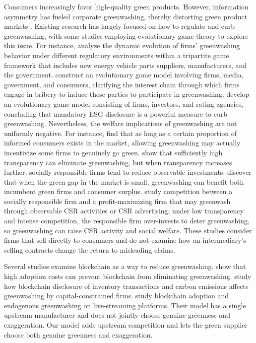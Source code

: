 \documentclass[preprint,review,12pt,authoryear,nopreprintline]{elsarticle}
\theoremstyle{definition}
\begin{document}
Consumers increasingly favor high-quality green products. However, information asymmetry has fueled corporate greenwashing, thereby distorting green product markets \citep{chen2023impact, Ye2024the}. Existing research has largely focused on how to regulate and curb greenwashing, with some studies employing evolutionary game theory to explore this issue. For instance, \citet{Gao2025esg} analyze the dynamic evolution of firms' greenwashing behavior under different regulatory environments within a tripartite game framework that includes new energy vehicle parts suppliers, manufacturers, and the government. \citet{wang2025go} construct an evolutionary game model involving firms, media, government, and consumers, clarifying the interest chain through which firms engage in bribery to induce these parties to participate in greenwashing. \citet{hao2026un} develop an evolutionary game model consisting of firms, investors, and rating agencies, concluding that mandatory ESG disclosure is a powerful measure to curb greenwashing. Nevertheless, the welfare implications of greenwashing are not uniformly negative. For instance, \citet{lee2018cor} find that as long as a certain proportion of informed consumers exists in the market, allowing greenwashing may actually incentivize some firms to genuinely go green. \citet{wu2020bad} show that sufficiently high transparency can eliminate greenwashing, but when transparency increases further, socially responsible firms tend to reduce observable investments. \citet{huang2020coml} discover that when the green gap in the market is small, greenwashing can benefit both incumbent green firms and consumer surplus. \citet{Wei2026} study competition between a socially responsible firm and a profit-maximizing firm that may greenwash through observable CSR activities or CSR advertising; under low transparency and intense competition, the responsible firm over-invests to deter greenwashing, so greenwashing can raise CSR activity and social welfare. These studies consider firms that sell directly to consumers and do not examine how an intermediary's selling contracts change the return to misleading claims.

Several studies examine blockchain as a way to reduce greenwashing. \citet{dong2023log} show that high adoption costs can prevent blockchain from eliminating greenwashing. \citet{xia2026bl} study how blockchain disclosure of inventory transactions and carbon emissions affects greenwashing by capital-constrained firms. \citet{xu2025should} study blockchain adoption and endogenous greenwashing on live-streaming platforms. Their model has a single upstream manufacturer and does not jointly choose genuine greenness and exaggeration. Our model adds upstream competition and lets the green supplier choose both genuine greenness and exaggeration.
\end{document}
